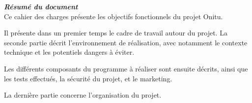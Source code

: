 \thispagestyle{empty}
\vspace*{10mm}

\textbf{\emph{\textcolor{epiBlue}{Résumé du document} } }\\

Ce cahier des charges présente les objectifs fonctionnels du projet Onitu.

Il présente dans un premier temps le cadre de travail autour du projet.
La seconde partie décrit l'environnement de réalisation, avec notamment le contexte technique et les potentiels dangers à éviter.

Les différents composants du programme à réaliser sont ensuite décrits, ainsi que les tests effectués, la sécurité du projet, et le marketing.

La dernière partie concerne l'organisation du projet.

\newpage
